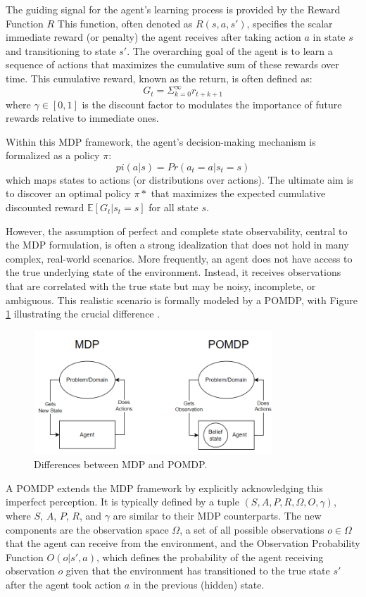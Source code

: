The guiding signal for the agent's learning process is provided by the Reward Function \(R\) This function, often denoted as \(R(s, a, s')\), specifies the scalar immediate reward (or penalty) the agent receives after taking action \(a\) in state \(s\) and transitioning to state \(s'\). The overarching goal of the agent is to learn a sequence of actions that maximizes the cumulative sum of these rewards over time. This cumulative reward, known as the return, is often defined as:
\[G_t = \Sigma_{k=0}^\infty r_{t+k+1}\]
where \(\gamma \in [0,1]\) is the discount factor to modulates the importance of future rewards relative to immediate ones.

Within this MDP framework, the agent's decision-making mechanism is formalized as a policy \(\pi\):
\[pi(a|s) = Pr(a_t = a | s_t = s)\] 
which maps states to actions (or distributions over actions). The ultimate aim is to discover an optimal policy \(\pi*\) that maximizes the expected cumulative discounted reward \(\mathbb{E}[G_t | s_t = s]\) for all state \(s\).

However, the assumption of perfect and complete state observability, central to the \gls{MDP} formulation, is often a strong idealization that does not hold in many complex, real-world scenarios. More frequently, an agent does not have access to the true underlying state of the environment. Instead, it receives observations that are correlated with the true state but may be noisy, incomplete, or ambiguous. This realistic scenario is formally modeled by a \gls{POMDP}, with Figure \ref{fig:MDP_POMDP} illustrating the crucial difference \cite{Blumenthal2024}.

\begin{figure}
  \centering
    \includegraphics[width=0.8\textwidth]{images/MDP_POMDP_comparison.png}
    \caption{Differences between MDP and POMDP.}
    \label{fig:MDP_POMDP}
\end{figure}

A \gls{POMDP} extends the \gls{MDP} framework by explicitly acknowledging this imperfect perception. It is typically defined by a tuple \((S, A, P, R, \Omega, O, \gamma)\), where \(S\), \(A\), \(P\), \(R\), and \(\gamma\) are similar to their \gls{MDP} counterparts. The new components are the observation space \(\Omega\), a set of all possible observations \(o \in \Omega\) that the agent can receive from the environment, and the Observation Probability Function \(O(o | s', a)\), which defines the probability of the agent receiving observation \(o\) given that the environment has transitioned to the true state \(s'\) after the agent took action \(a\) in the previous (hidden) state.

